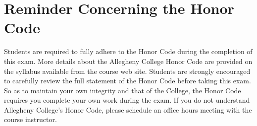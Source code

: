 \documentclass[11pt]{article}
\begin{document}
\section*{Reminder Concerning the Honor Code}

Students are required to fully adhere to the Honor Code during the completion of
this exam. More details about the Allegheny College Honor Code are provided on
the syllabus available from the course web site. Students are strongly
encouraged to carefully review the full statement of the Honor Code before
taking this exam. So as to maintain your own integrity and that of the College,
the Honor Code requires you complete your own work during the exam. If you do
not understand Allegheny College's Honor Code, please schedule an office hours
meeting with the course instructor.



\end{document}

